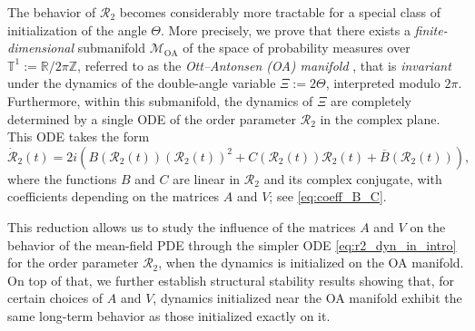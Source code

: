 \documentclass[10pt]{article}
\theoremstyle{definition}
\theoremstyle{definition}
\newtheorem{remark}[theorem]{Remark}
\numberwithin{equation}{section}
\newcommand{\R}{\mathbb{R}}
\newcommand{\M}{\mathcal{M}}
\newcommand{\BBT}{\mathbb{T}}
\newcommand{\CR}{\mathcal{R}}
\begin{document}
The behavior of $\CR_2$ becomes considerably more tractable for a special class of initialization of the angle $\Theta$.
More precisely, we prove that there exists a \textit{finite-dimensional} submanifold $\M_{\mathrm{OA}}$ of the space of probability measures over $\BBT^1 := \R/2\pi \mathbb{Z}$, referred to as the \emph{Ott--Antonsen (OA) manifold} \cite{ott2008low}, that is \emph{invariant} under the dynamics of the double-angle variable $\Xi := 2\Theta$, interpreted modulo $2\pi$.
Furthermore, within this submanifold, the dynamics of $\Xi$ are completely determined by a single ODE of the order parameter $\CR_2$ in the complex plane. This ODE takes the form 
\begin{equation}\label{eq:r2_dyn_in_intro}
\Dot{\CR}_2(t) = 2i \left( B(\CR_2(t)) (\CR_2(t))^2 + C(\CR_2(t)) \CR_2(t) + \overline{B}(\CR_2(t)) \right),
\end{equation}
where the functions $B$ and $C$ are linear in $\CR_2$ and its complex conjugate, with coefficients depending on the matrices $A$ and $V$; see \eqref{eq:coeff_B_C}. 

This reduction allows us to study the influence of the matrices $A$ and $V$ on the behavior of the mean-field PDE through the simpler ODE \eqref{eq:r2_dyn_in_intro} for the order parameter $\CR_2$, when the dynamics is initialized on the OA manifold.
On top of that, we further establish structural stability results showing that, for certain choices of $A$ and $V$, dynamics initialized near the OA manifold exhibit the same long-term behavior as those initialized exactly on it. 

\end{document}
